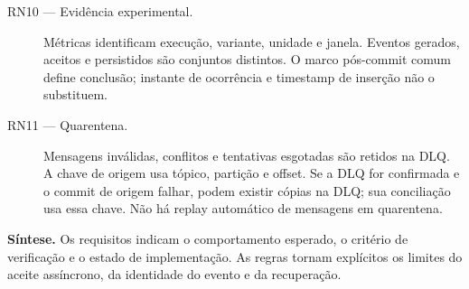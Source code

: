 \begin{description}
\item[RN10 --- Evidência experimental.] Métricas identificam execução, variante, unidade e janela. Eventos gerados, aceitos e persistidos são conjuntos distintos. O marco pós-commit comum define conclusão; instante de ocorrência e timestamp de inserção não o substituem.
\item[RN11 --- Quarentena.] Mensagens inválidas, conflitos e tentativas esgotadas são retidos na DLQ. A chave de origem usa tópico, partição e offset. Se a DLQ for confirmada e o commit de origem falhar, podem existir cópias na DLQ; sua conciliação usa essa chave. Não há replay automático de mensagens em quarentena.
\end{description}
\textbf{Síntese.} Os requisitos indicam o comportamento esperado, o critério de verificação e o estado de implementação. As regras tornam explícitos os limites do aceite assíncrono, da identidade do evento e da recuperação.
